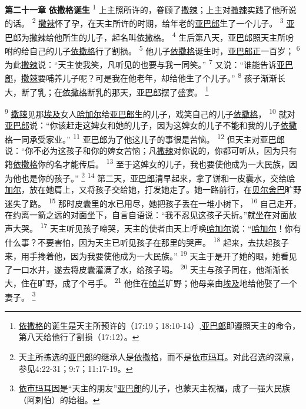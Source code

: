 \textbf{第二十一章 }
\textbf{依撒格诞生 }
\textsuperscript{1}
上主照所许的，眷顾了\uline{撒辣}；上主对\uline{撒辣}实践了他所说的话。
\textsuperscript{2}
\uline{撒辣}怀了孕，在天主所许的时期，给年老的\uline{亚巴郎}生了一个儿子。
\textsuperscript{3}
\uline{亚巴郎}为\uline{撒辣}给他所生的儿子，起名叫\uline{依撒格}。
\textsuperscript{4}
生后第八天，\uline{亚巴郎}照天主所吩咐的给自己的儿子\uline{依撒格}行了割损。
\textsuperscript{5}
他儿子\uline{依撒格}诞生时，\uline{亚巴郎}正一百岁；
\textsuperscript{6}
为此\uline{撒辣}说：“天主使我笑，凡听见的也要与我一同笑。”
\textsuperscript{7}
又说：“谁能告诉\uline{亚巴郎}，\uline{撒辣}要哺养儿子呢？可是我在他老年，却给他生了个儿子。”
\textsuperscript{8}
孩子渐渐长大，断了乳；在\uline{依撒格}断乳的那天，\uline{亚巴郎}摆了盛宴。
\footnote{\uline{依撒格}的诞生是天主所预许的（17:19；18:10-14）,\uline{亚巴郎}即遵照天主的命令，第八天给他行了割损（17:12）。}

\textsuperscript{9}
\uline{撒辣}见那\uline{埃及}女人\uline{哈加尔}给\uline{亚巴郎}生的儿子，戏笑自己的儿子\uline{依撒格}，
\textsuperscript{10}
就对\uline{亚巴郎}说：“你该赶走这婢女和她的儿子，因为这婢女的儿子不能和我的儿子\uline{依撒格}一同承受家业。”
\textsuperscript{11}
\uline{亚巴郎}为了他这儿子的事很是苦恼。
\textsuperscript{12}
但天主对\uline{亚巴郎}说：“你不必为这孩子和你的婢女苦恼；凡\uline{撒辣}对你说的，你都可听从，因为只有籍\uline{依撒格}你的名才能传后。
\textsuperscript{13}
至于这婢女的儿子，我也要使他成为一大民族，因为他也是你的孩子。”
\footnote{天主所拣选的\uline{亚巴郎}的继承人是\uline{依撒格}，而不是\uline{依市玛耳}。对此召选的深意，参见4:22-31；9:7；11:17-19。}
\textsuperscript{14}
第二天，\uline{亚巴郎}清早起来，拿了饼和一皮囊水，交给\uline{哈加尔}，放在她肩上，又将孩子交给她，打发她走了。她一路前行，在\uline{贝尔}\uline{舍巴}旷野迷失了路。
\textsuperscript{15}
那时皮囊里的水已用尽，她把孩子丢在一堆小树下，
\textsuperscript{16}
自己走开，在约离一箭之远的对面坐下，自言自语说：“我不忍见这孩子夭折。”就坐在对面放声大哭。
\textsuperscript{17}
天主听见孩子啼哭，天主的使者由天上呼唤\uline{哈加尔}说：“\uline{哈加尔}！你有什么事？不要害怕，因为天主已听见孩子在那里的哭声。
\textsuperscript{18}
起来，去扶起孩子来，用手搀着他，因为我要使他成为一大民族。”
\textsuperscript{19}
天主于是开了她的眼，她看见了一口水井，遂去将皮囊灌满了水，给孩子喝。
\textsuperscript{20}
天主与孩子同在，他渐渐长大，住在旷野，成了个弓手。
\textsuperscript{21}
他住在\uline{帕兰}旷野；他母亲由\uline{埃及}地给他娶了一个妻子。
\footnote{\uline{依市玛耳}因是“天主的朋友”\uline{亚巴郎}的儿子，也蒙天主祝福，成了一强大民族（阿剌伯）的始祖。}

